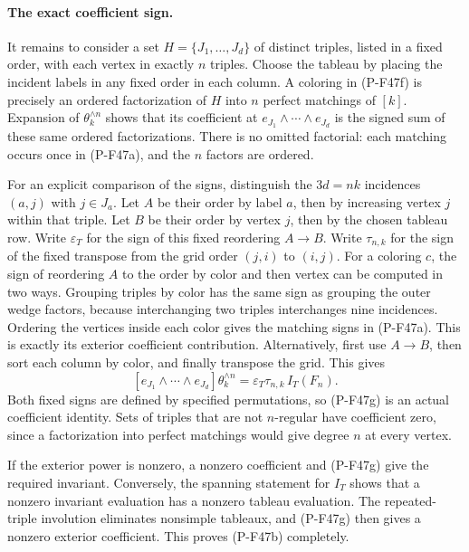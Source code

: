 \paragraph{The exact coefficient sign.}
It remains to consider a set $H=\{J_1,\ldots,J_d\}$
of distinct triples, listed in a fixed order, with
each vertex in exactly $n$ triples. Choose the tableau
by placing the incident labels in any fixed order in
each column. A coloring in (P-F47f) is precisely an
ordered factorization of $H$ into $n$ perfect matchings
of $[k]$. Expansion of $\theta_k^{\wedge n}$ shows that
its coefficient at $e_{J_1}\wedge\cdots\wedge e_{J_d}$
is the signed sum of these same ordered factorizations.
There is no omitted factorial: each matching occurs
once in (P-F47a), and the $n$ factors are ordered.

For an explicit comparison of the signs, distinguish
the $3d=nk$ incidences $(a,j)$ with $j\in J_a$.
Let $A$ be their order by label $a$, then by increasing
vertex $j$ within that triple. Let $B$ be their order
by vertex $j$, then by the chosen tableau row. Write
$\varepsilon_T$ for the sign of this fixed reordering
$A\to B$. Write $\tau_{n,k}$ for the sign of the fixed
transpose from the grid order $(j,i)$ to $(i,j)$.
For a coloring $c$, the sign of reordering $A$ to
the order by color and then vertex can be computed
in two ways. Grouping triples by color has the same
sign as grouping the outer wedge factors, because
interchanging two triples interchanges nine incidences.
Ordering the vertices inside each color gives the
matching signs in (P-F47a). This is exactly its exterior
coefficient contribution. Alternatively, first use
$A\to B$, then sort each column by color, and finally
transpose the grid. This gives
\[
 [e_{J_1}\wedge\cdots\wedge e_{J_d}]
                \theta_k^{\wedge n}
       =\varepsilon_T\tau_{n,k}\,I_T(F_n).
                                                        \tag{P-F47g}
\]
Both fixed signs are defined by specified permutations,
so (P-F47g) is an actual coefficient identity.
Sets of triples that are not $n$-regular have coefficient
zero, since a factorization into perfect matchings
would give degree $n$ at every vertex.

If the exterior power is nonzero, a nonzero coefficient
and (P-F47g) give the required invariant. Conversely,
the spanning statement for $I_T$ shows that a nonzero
invariant evaluation has a nonzero tableau evaluation.
The repeated-triple involution eliminates nonsimple
tableaux, and (P-F47g) then gives a nonzero exterior
coefficient. This proves (P-F47b) completely.

